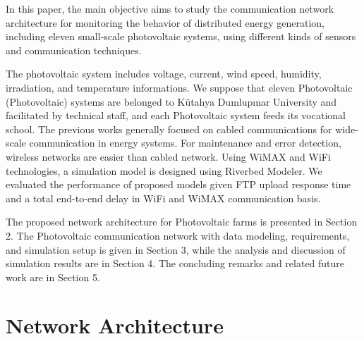 \documentclass[conference, letterpaper]{IEEEtran}
\begin{document}
In this paper, the main objective aims to study the communication network architecture for monitoring the behavior of distributed energy generation, including eleven small-scale photovoltaic systems, using different kinds of sensors and communication techniques. 

The photovoltaic system includes voltage, current, wind speed, humidity, irradiation, and temperature informations. We suppose that eleven Photovoltaic (Photovoltaic) systems are belonged to Kütahya Dumlupınar University and facilitated by technical staff, and each Photovoltaic system feeds its vocational school. The previous works generally focused on cabled communications for wide-scale communication in energy systems. For maintenance and error detection, wireless networks are easier than cabled network. Using WiMAX and WiFi technologies, a simulation model is designed using Riverbed Modeler. We evaluated the performance of proposed models given FTP upload response time and a total end-to-end delay in WiFi and WiMAX communication basis. 


The proposed network architecture for Photovoltaic farms is presented in Section 2. The Photovoltaic communication network with data modeling, requirements, and simulation setup is given in Section 3, while the analysis and discussion of simulation results are in Section 4. The concluding remarks and related future work are in Section 5.

\newpage
{}
\section{Network Architecture}
\end{document}
